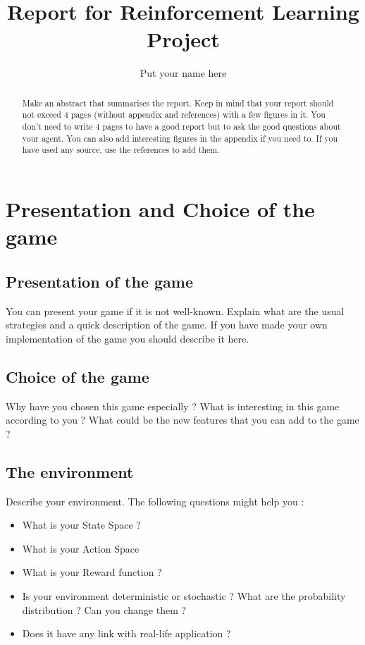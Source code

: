 \documentclass[letterpaper, 10 pt, conference]{ieeeconf}  %
\title{\LARGE \bf
Report for Reinforcement Learning Project
}
\author{Put your name here%
}
\begin{document}
\maketitle
\thispagestyle{empty}
\pagestyle{empty}


\begin{abstract}

Make an abstract that summarises the report. Keep in mind that your report should not exceed 4 pages (without appendix and references) with a few figures in it. You don't need to write 4 pages to have a good report but to ask the good questions about your agent. You can also add interesting figures in the appendix if you need to. If you have used any source, use the references to add them.

\end{abstract}


\section{Presentation and Choice of the game}

\subsection{Presentation of the game}

You can present your game if it is not well-known. Explain what are the usual strategies and a quick description of the game. If you have made your own implementation of the game you should describe it here.

\subsection{Choice of the game}

Why have you chosen this game especially ? What is interesting in this game according to you ? What could be the new features that you can add to the game ? 

\subsection{The environment}

Describe your environment. The following questions might help you : 
\begin{itemize}
    \item What is your State Space ?
    \item What is your Action Space
    \item What is your Reward function ?
    \item Is your environment deterministic or stochastic ? What are the probability distribution ? Can you change them ?
    \item Does it have any link with real-life application ?
\end{itemize}{}
\end{document}
